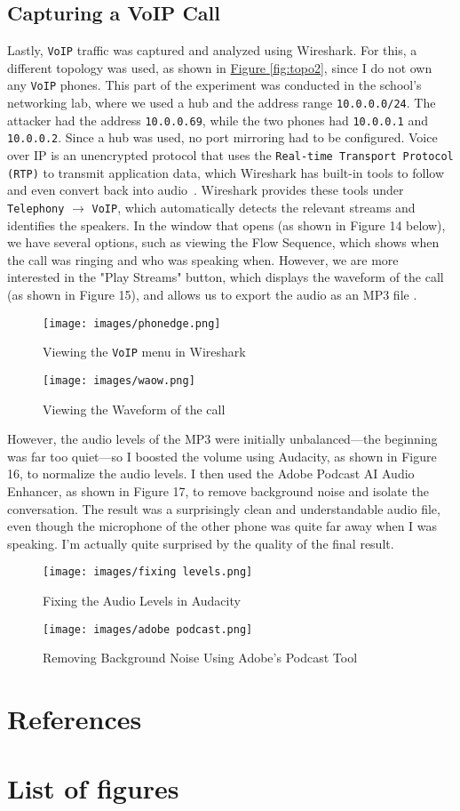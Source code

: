 \documentclass[a4paper]{article}
\newcommand{\abc}{\hfill \break}
\begin{document}
\subsection{Capturing a VoIP Call}
Lastly, \texttt{VoIP} traffic was captured and analyzed using Wireshark. For this, a different topology was used, as shown in \textcolor{blue}{\hyperref[fig:nwconf]{Figure \ref{fig:topo2}}}, since I do not own any \texttt{VoIP} phones. This part of the experiment was conducted in the school's networking lab, where we used a hub and the address range \texttt{10.0.0.0/24}. The attacker had the address \texttt{10.0.0.69}, while the two phones had \texttt{10.0.0.1} and \texttt{10.0.0.2}. Since a hub was used, no port mirroring had to be configured.\abc
Voice over IP is an unencrypted protocol that uses the \texttt{Real-time Transport Protocol (RTP)} to transmit application data, which Wireshark has built-in tools to follow and even convert back into audio~\cite{voip-wireshark, rtp}.\abc
Wireshark provides these tools under \texttt{Telephony} $\rightarrow$ \texttt{VoIP}, which automatically detects the relevant streams and identifies the speakers. In the window that opens (as shown in Figure 14 below), we have several options, such as viewing the Flow Sequence, which shows when the call was ringing and who was speaking when. However, we are more interested in the "Play Streams" button, which displays the waveform of the call (as shown in Figure 15), and allows us to export the audio as an MP3 file \cite{voip-wireshark}.\newpage
\begin{figure}[!htbp]
	\texttt{[image: images/phonedge.png]}
	\centering
	\caption{Viewing the \texttt{VoIP} menu in Wireshark}
\end{figure} \abc
\begin{figure}[!htbp]
	\texttt{[image: images/waow.png]}
	\centering
	\caption{Viewing the Waveform of the call}
\end{figure} \abc
However, the audio levels of the MP3 were initially unbalanced—the beginning was far too quiet—so I boosted the volume using Audacity, as shown in Figure 16, to normalize the audio levels. I then used the Adobe Podcast AI Audio Enhancer, as shown in Figure 17, to remove background noise and isolate the conversation. The result was a surprisingly clean and understandable audio file, even though the microphone of the other phone was quite far away when I was speaking. I'm actually quite surprised by the quality of the final result. \newpage
\begin{figure}[!htbp]
	\texttt{[image: images/fixing levels.png]}
	\centering
	\caption{Fixing the Audio Levels in Audacity}
\end{figure} \abc
\begin{figure}[!htbp]
	\texttt{[image: images/adobe podcast.png]}
	\centering
	\caption{Removing Background Noise Using Adobe's Podcast Tool}
\end{figure} \abc



\newpage
\section{References}

\newpage
\section{List of figures}

\listoffigures
\end{document}
